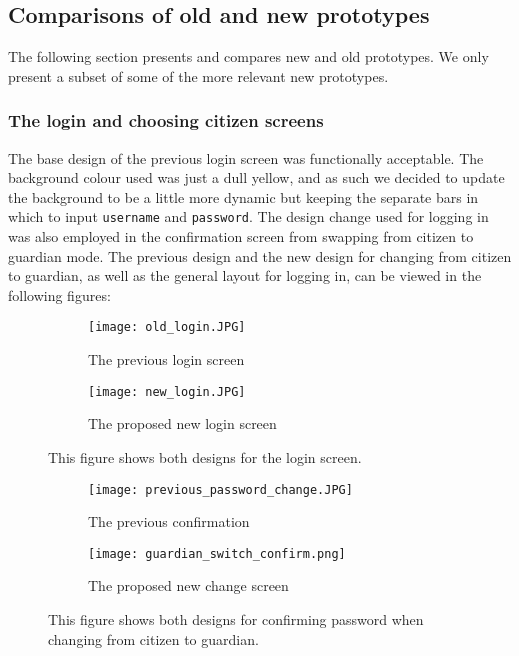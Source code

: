 \subsection{Comparisons of old and new prototypes}
The following section presents and compares new and old prototypes. 
We only present a subset of some of the more relevant new prototypes.

\subsubsection{The login and choosing citizen screens}
The base design of the previous login screen was functionally acceptable. 
The background colour used was just a dull yellow, and as such we decided to update the background to be a little more dynamic but keeping the separate bars in which to input \texttt{username} and \texttt{password}.
The design change used for logging in was also employed in the confirmation screen from swapping from citizen to guardian mode. 
The previous design and the new design for changing from citizen to guardian, as well as the general layout for logging in, can be viewed in the following figures:
\begin{figure}[H]
    \begin{subfigure}{0.5\textwidth}
    \texttt{[image: old\_login.JPG]} 
    \caption{The previous login screen}
    \label{fig:previous_login}
    \end{subfigure}
    \begin{subfigure}{0.5\textwidth}
        \texttt{[image: new\_login.JPG]}
    \caption{The proposed new login screen}
    \label{fig:new_login}
    \end{subfigure} 
    \caption{This figure shows both designs for the login screen.}
    \label{fig:guardian_confirm}
\end{figure}
\noindent
\begin{figure}[H]
    \begin{subfigure}{0.5\textwidth}
    \texttt{[image: previous\_password\_change.JPG]} 
    \caption{The previous confirmation}
    \label{fig:previous_guardian_confirm}
    \end{subfigure}
    \begin{subfigure}{0.5\textwidth}
        \texttt{[image: guardian\_switch\_confirm.png]}
    \caption{The proposed new change screen}
    \label{fig:new_guardian_confirm}
    \end{subfigure} 
    \caption{This figure shows both designs for confirming password when changing from citizen to guardian.}
    \label{fig:guardian_confirm_comparison}
\end{figure}
